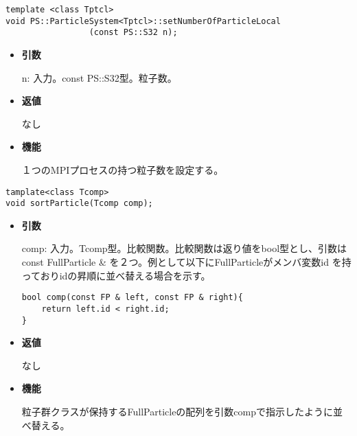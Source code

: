 
\begin{screen}
\begin{verbatim}
template <class Tptcl>
void PS::ParticleSystem<Tptcl>::setNumberOfParticleLocal
                 (const PS::S32 n);
\end{verbatim}
\end{screen}

\begin{itemize}

\item {\bf 引数}

n: 入力。const PS::S32型。粒子数。

\item {\bf 返値}

なし

\item {\bf 機能}

１つのMPIプロセスの持つ粒子数を設定する。

\end{itemize}


\label{sec:ParticleSystem:sortParticle}

\begin{screen}
\begin{verbatim}
tamplate<class Tcomp>
void sortParticle(Tcomp comp);
\end{verbatim}
\end{screen}

\begin{itemize}

\item {\bf 引数}

comp: 入力。Tcomp型。比較関数。比較関数は返り値をbool型とし、引数は
const FullParticle \& を２つ。例として以下にFullParticleがメンバ変数id
を持っておりidの昇順に並べ替える場合を示す。

\begin{verbatim}
bool comp(const FP & left, const FP & right){
    return left.id < right.id;
}
\end{verbatim}

\item {\bf 返値}

なし

\item {\bf 機能}

粒子群クラスが保持するFullParticleの配列を引数compで指示したように並べ替える。

\end{itemize}
